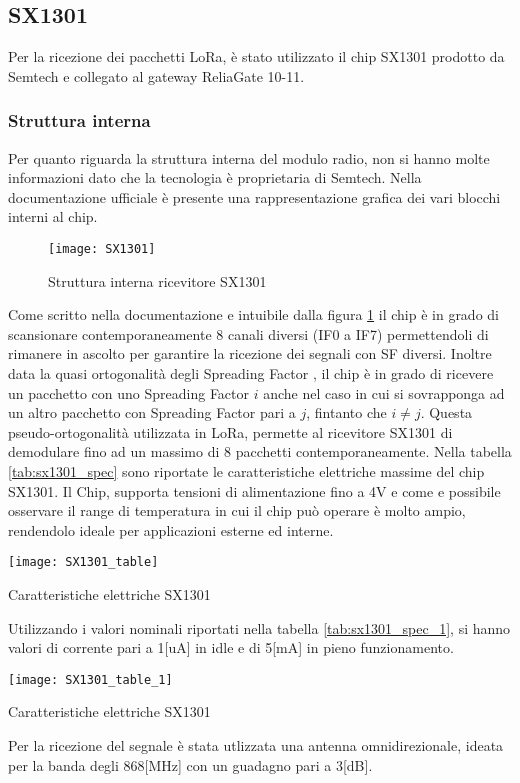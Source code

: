 \subsection{SX1301}
Per la ricezione dei pacchetti LoRa, è stato utilizzato il chip SX1301 prodotto
da Semtech e collegato al gateway ReliaGate 10-11.
\subsubsection{Struttura interna}
Per quanto riguarda la struttura interna del modulo radio, non si hanno molte
informazioni dato che la tecnologia è proprietaria di Semtech. Nella
documentazione ufficiale è presente una rappresentazione grafica dei vari
blocchi interni al chip.

\begin{figure}[th]
        \centering 
                \texttt{[image: SX1301]}
        \caption{Struttura interna ricevitore SX1301}
        \label{fig:sx1301}
\end{figure}

Come scritto nella documentazione \cite{SX1301} e intuibile dalla
figura \ref{fig:sx1301} il chip è in grado di scansionare contemporaneamente 
8 canali diversi (IF0 a IF7)  permettendoli di rimanere in ascolto per garantire
la ricezione dei segnali con SF diversi.
Inoltre data la quasi ortogonalità degli Spreading Factor
, il chip è in grado di ricevere un pacchetto
con uno Spreading Factor $i$ anche nel caso in cui si sovrapponga ad un altro
pacchetto con Spreading Factor pari a $j$, fintanto che $i\neq j$. Questa
pseudo-ortogonalità utilizzata in LoRa, permette al ricevitore  SX1301 
di demodulare fino ad un massimo di 8 pacchetti contemporaneamente.
Nella tabella \ref{tab:sx1301_spec} sono riportate le caratteristiche elettriche
massime del  chip SX1301. Il Chip, supporta tensioni di
alimentazione fino a 4V e  come e possibile osservare il range di temperatura in cui il
chip può operare è molto ampio, rendendolo ideale per applicazioni esterne ed
interne. 

\begin{table}[th]
        \centering 
                \texttt{[image: SX1301\_table]}
        \caption{Caratteristiche elettriche SX1301}
\label{tab:sx1301_spec}
\end{table}
Utilizzando i valori nominali riportati nella tabella \ref{tab:sx1301_spec_1},
si hanno valori di corrente pari a 1[uA] in idle  e di 5[mA] in pieno
funzionamento.
\begin{table}[th]
        \centering 
                \texttt{[image: SX1301\_table\_1]}
        \caption{Caratteristiche elettriche SX1301}
        \label{tab:sx1301_spec_1}
\end{table}
Per la ricezione del segnale è stata utlizzata una antenna omnidirezionale,
ideata per la banda degli 868[MHz] con un guadagno pari a 3[dB].
